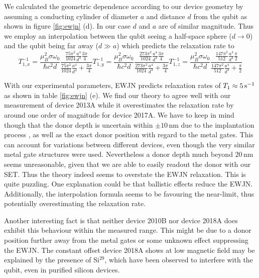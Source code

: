 \documentclass[%
 reprint,
 amsmath,amssymb,
 aps,
]{revtex4-1}
\begin{document}
We calculated the geometric dependence according to our device geometry by assuming a conducting cylinder of diameter $a$ and distance $d$ from the qubit as shown in figure \ref{fig:ewjn} (d). In our case $d$ and $a$ are of similar magnitude. Thus we employ an interpolation between the qubit seeing a half-space sphere ($d\rightarrow 0$) and the qubit being far away ($d\gg a$) which predicts the relaxation rate to 
\begin{subequations}
\begin{equation}
T_{1,x}^{-1}=\frac{\mu_B^2\sigma\omega_0}{\hbar c^2d}\frac{\frac{75\pi^2}{1024}\frac{a^4}{d^4}\frac{3\pi}{4}}{\frac{75\pi^2}{1024}\frac{a^4}{d^4}+\frac{3\pi}{4}}
\end{equation}
\begin{equation}
T_{1,y}^{-1}=\frac{\mu_B^2\sigma\omega_0}{\hbar c^2d}\frac{\frac{273\pi^2}{1024}\frac{a^4}{d^4}\frac{3\pi}{4}}{\frac{273\pi^2}{1024}\frac{a^4}{d^4}+\frac{3\pi}{4}}
\end{equation}
\begin{equation}
T_{1,z}^{-1}=\frac{\mu_B^2\sigma\omega_0}{\hbar c^2d}\frac{\frac{147\pi^2}{512}\frac{a^4}{d^4}\frac{\pi}{2}}{\frac{147\pi^2}{512}\frac{a^4}{d^4}+\frac{\pi}{2}}
\end{equation}
\end{subequations}

With our experimental parameters, EWJN predicts relaxation rates of $T_1\approx5\,\rm{s}^{-1}$ as shown in table \ref{fig:ewjn} (e). We find our theory to agree well with our measurement of device 2013A while it overestimates the relaxation rate by around one order of magnitude for device 2017A. We have to keep in mind though that the donor depth is uncertain within $\pm10\,$nm due to the implantation process \cite{VanDonkelaar2015}, as well as the exact donor position with regard to the metal gates. This can account for variations between different devices, even though the very similar metal gate structures were used. Nevertheless a donor depth much beyond $20\,$nm seems unreasonable, given that we are able to easily readout the donor with our SET. Thus the theory indeed seems to overstate the EWJN relaxation. This is quite puzzling. One explanation could be that ballistic effects reduce the EWJN. Additionally, the interpolation formula seems to be favouring the near-limit, thus potentially overestimating the relaxation rate. 

Another interesting fact is that neither device 2010B nor device 2018A does exhibit this behaviour within the measured range. This might be due to a donor position further away from the metal gates or some unknown effect suppressing the EWJN. The constant offset device 2018A shows at low magnetic field may be explained by the presence of Si$^{29}$, which have been observed to interfere with the qubit, even in purified silicon devices\cite{Morello2010}. 
\end{document}
